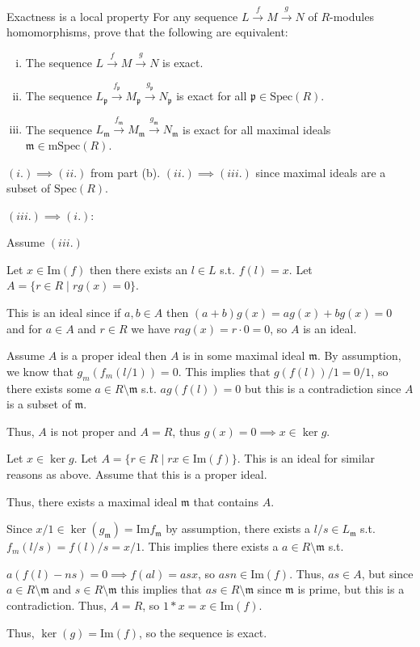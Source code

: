 \documentclass[12pt, letterpaper]{article}
\newcommand{\p}{\mathfrak{p}}
\newcommand{\Spec}{\mathrm{Spec}}
\newcommand{\mf}[1]{\mathfrak{#1}}
\begin{document}
\begin{subproblem}{Exactness is a local property}
    For any sequence $L \overset{f}{\longrightarrow} M \overset{g}{\longrightarrow} N$ of $R$-modules homomorphisms,
    prove that the following are equivalent:
    \begin{enumerate}[i.]
        \item The sequence $L \overset{f}{\longrightarrow} M \overset{g}{\longrightarrow} N$ is exact.
        \item The sequence $L_\p \overset{f_\p}{\longrightarrow} M_\p \overset{g_\p}{\longrightarrow} N_\p$ is exact for all $\p \in \Spec(R)$.
        \item The sequence $L_\mf{m} \overset{f_\mf{m}}{\longrightarrow} M_\mf{m} \overset{g_\mf{m}}{\longrightarrow} N_\mf{m}$ is exact for all maximal ideals $\mf{m} \in \mathrm{mSpec}(R)$.
    \end{enumerate}
\end{subproblem}
\begin{problemproof}
    $(i.) \implies (ii.)$ from part (b). $(ii.) \implies (iii.)$ since maximal ideals are a subset of $\Spec(R)$.

    $(iii.) \implies (i.)$:

    Assume $(iii.)$

    Let $x \in \mathrm{Im}(f)$ then there exists an $l \in L$ s.t. $f(l)=x$. Let $A=\{r \in R \mid rg(x)=0\}$.

    This is an ideal since if $a,b \in A$ then $(a+b)g(x)=ag(x)+bg(x)=0$ and for $a \in A$ and $r \in R$ we have $ra g(x)=r\cdot 0 =0$, so $A$ is an ideal.

    Assume $A$ is a proper ideal then $A$ is in some maximal ideal $\mf{m}$. By assumption, we know that $g_m(f_m(l/1))=0$. This implies that $g(f(l))/1=0/1$, so there exists some $a \in R \setminus \mf{m}$ s.t. $ag(f(l))=0$ but this is a contradiction since $A$ is a subset of $\mf{m}$.

    Thus, $A$ is not proper and $A=R$, thus $g(x)=0 \implies x \in \ker{g}$.

    Let $x \in \ker{g}$. Let $A=\{r \in R \mid rx \in \mathrm{Im}(f)\}$. This is an ideal for similar reasons as above. Assume that this is a proper ideal.

    Thus, there exists a maximal ideal $\mf{m}$ that contains $A$.

    Since $x/1 \in \ker(g_\mf{m})=\mathrm{Im}f_\mf{m}$ by assumption, 
    there exists a $l / s \in L_\mf{m}$ s.t. $f_m(l/s)=f(l)/s=x/1$. 
    This implies there exists a $a \in R \setminus \mf{m}$ s.t.
    
    $a(f(l)-ns)=0 \implies f(al)=asx$, so $asn \in \mathrm{Im}(f)$. 
    Thus, $as \in A$, but since $a \in R \setminus \mf{m}$ and $s \in R \setminus \mf{m}$ this implies that $as \in R \setminus \mf{m}$ since $\mf{m}$ is prime, but this is a contradiction. Thus, $A=R$, so $1*x=x \in \mathrm{Im}(f)$.

    Thus, $\ker(g)=\mathrm{Im}(f)$, so the sequence is exact.
\end{problemproof}
\end{document}
